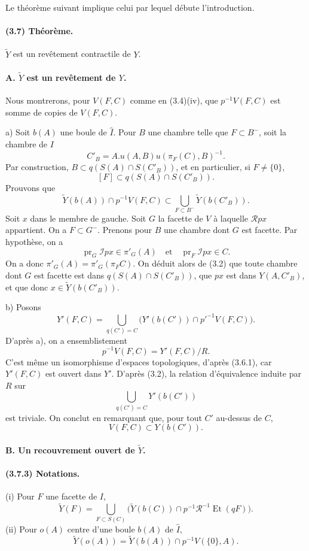 \documentclass[10pt,a4paper]{article}
\newcommand{\mcR}{\mathcal R}
\newcommand{\mcI}{\mathcal I}
\begin{document}
Le théorème suivant implique celui par lequel débute l'introduction.

\paragraph{(3.7) Théorème.} \(\widetilde Y\) est un revêtement contractile de \(Y\).

\paragraph{A. \(\widetilde Y\) est un revêtement de \(Y\).} Nous montrerons, pour \(V(F,C)\) comme en (3.4)(iv), que \(p^{-1}V(F,C)\) est somme de copies de \(V(F,C)\).

a) Soit \(b(A)\) une boule de \(\widehat I\). Pour \(B\) une chambre telle que \(F\subset B^{-}\), soit la chambre de \(I\)
\[
C'_B=A.u(A,B)u(\pi_F(C),B)^{-1}.
\]
Par construction, \(B\subset q(S(A)\cap S(C'_B))\), et en particulier, si \(F\ne\{0\}\),
\[
\tag{3.7.1}
[F]\subset q(S(A)\cap S(C'_B)).
\]
Prouvons que
\[
\tag{3.7.2}
\widetilde Y(b(A))\cap p^{-1}V(F,C)
\subset
\bigcup_{F\subset B^-}\widetilde Y(b(C'_B)).
\]
Soit \(x\) dans le membre de gauche. Soit \(G\) la facette de \(V\) à laquelle \(\mcR px\) appartient. On a \(F\subset G^{-}\). Prenons pour \(B\) une chambre dont \(G\) est facette. Par hypothèse, on a
\[
\operatorname{pr}_G\mcI px\in\pi'_G(A)
\quad\text{et}\quad
\operatorname{pr}_F\mcI px\in C.
\]
On a donc \(\pi'_G(A)=\pi'_G(\pi_F C)\). On déduit alors de (3.2) que toute chambre dont \(G\) est facette est dans \(q(S(A)\cap S(C'_B))\), que \(px\) est dans \(Y(A,C'_B)\), et que donc \(x\in \widetilde Y(b(C'_B))\).

b) Posons
\[
Y'(F,C)=
\bigcup_{q(C')=C}
\bigl(Y'(b(C'))\cap p'^{-1}V(F,C)\bigr).
\]
D'après a), on a ensemblistement
\[
p^{-1}V(F,C)=Y'(F,C)/R.
\]
C'est même un isomorphisme d'espaces topologiques, d'après (3.6.1), car \(Y'(F,C)\) est ouvert dans \(Y'\). D'après (3.2), la relation d'équivalence induite par \(R\) sur
\[
\bigcup_{q(C')=C}Y'(b(C'))
\]
est triviale. On conclut en remarquant que, pour tout \(C'\) au-dessus de \(C\),
\[
V(F,C)\subset Y(b(C')).
\]

\paragraph{B. Un recouvrement ouvert de \(\widetilde Y\).}

\paragraph{(3.7.3) Notations.} (i) Pour \(F\) une facette de \(I\),
\[
\widetilde Y(F)=
\bigcup_{F\subset S(C)}
\bigl(\widetilde Y(b(C))\cap p^{-1}\mcR^{-1}\operatorname{Et}(qF)\bigr).
\]
(ii) Pour \(o(A)\) centre d'une boule \(b(A)\) de \(\widehat I\),
\[
\widetilde Y(o(A))=\widetilde Y(b(A))\cap p^{-1}V(\{0\},A).
\]
\end{document}
